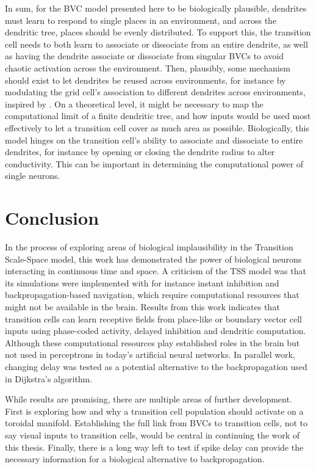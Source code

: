 \documentclass{article}
\begin{document}
    In sum, for the BVC model presented here to be biologically plausible, dendrites must learn to respond to single places in an environment, and across the dendritic tree, places should be evenly distributed. To support this, the transition cell needs to both learn to associate or dissociate from an entire dendrite, as well as having the dendrite associate or dissociate from singular BVCs to avoid chaotic activation across the environment. Then, plausibly, some mechanism should exist to let dendrites be reused across environments, for instance by modulating the grid cell's association to different dendrites across environments, inspired by \parencite{Alabi2022}. 
    On a theoretical level, it might be necessary to map the computational limit of a finite dendritic tree, and how inputs would be used most effectively to let a transition cell cover as much area as possible. Biologically, this model hinges on the transition cell's ability to associate and dissociate to entire dendrites, for instance by opening or closing the dendrite radius to alter conductivity. This can be important in determining the computational power of single neurons.

    \newpage
    \section{Conclusion}
    In the process of exploring areas of biological implausibility in the Transition Scale-Space model, this work has demonstrated the power of biological neurons interacting in continuous time and space. A criticism of the TSS model was that its simulations were implemented with for instance instant inhibition and backpropagation-based navigation, which require computational resources that might not be available in the brain. Results from this work indicates that transition cells can learn receptive fields from place-like or boundary vector cell inputs using phase-coded activity, delayed inhibition and dendritic computation. Although these computational resources play established roles in the brain but not used in perceptrons in today's artificial neural networks. In parallel work, changing delay was tested as a potential alternative to the backpropagation used in Dijkstra's algorithm. 
    
    While results are promising, there are multiple areas of further development. First is exploring how and why a transition cell population should activate on a toroidal manifold. Establishing the full link from BVCs to transition cells, not to say visual inputs to transition cells, would be central in continuing the work of this thesis. Finally, there is a long way left to test if spike delay can provide the necessary information for a biological alternative to backpropagation.
\end{document}
